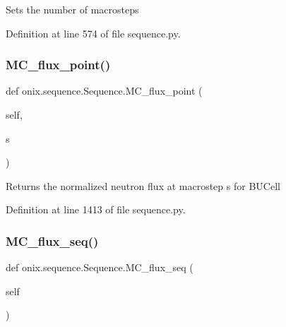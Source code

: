 \begin{DoxyVerb}Sets the number of macrosteps\end{DoxyVerb}
 

Definition at line 574 of file sequence.\+py.

\mbox{\label{classonix_1_1sequence_1_1Sequence_ac27e3151316ac349ee31d5eb4a773d4d}} 
\subsubsection{\texorpdfstring{M\+C\+\_\+flux\+\_\+point()}{MC\_flux\_point()}}
{\footnotesize\ttfamily def onix.\+sequence.\+Sequence.\+M\+C\+\_\+flux\+\_\+point (\begin{DoxyParamCaption}\item[{}]{self,  }\item[{}]{s }\end{DoxyParamCaption})}

\begin{DoxyVerb}Returns the normalized neutron flux at macrostep s for BUCell\end{DoxyVerb}
 

Definition at line 1413 of file sequence.\+py.

\mbox{\label{classonix_1_1sequence_1_1Sequence_a4abda8c26332657e46bf332c76e9016d}} 
\subsubsection{\texorpdfstring{M\+C\+\_\+flux\+\_\+seq()}{MC\_flux\_seq()}\hspace{0.1cm}{\footnotesize\ttfamily [1/2]}}
{\footnotesize\ttfamily def onix.\+sequence.\+Sequence.\+M\+C\+\_\+flux\+\_\+seq (\begin{DoxyParamCaption}\item[{}]{self }\end{DoxyParamCaption})}

